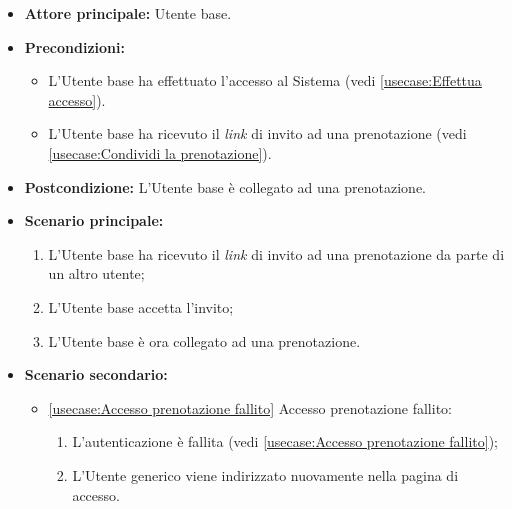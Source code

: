\label{usecase:Accesso alla prenotazione}
\begin{itemize}
	\item \textbf{Attore principale:} Utente base.

	\item \textbf{Precondizioni:} 
	\begin{itemize}
		\item L'Utente base ha effettuato l'accesso al Sistema (vedi \autoref{usecase:Effettua accesso}).
		\item L'Utente base ha ricevuto il \textit{link} di invito ad una prenotazione (vedi \autoref{usecase:Condividi la prenotazione}).
	\end{itemize}
		

	\item \textbf{Postcondizione:} L'Utente base è collegato ad una prenotazione.

	\item \textbf{Scenario principale:}
	      \begin{enumerate}
		      \item L'Utente base ha ricevuto il \textit{link} di invito ad una prenotazione da parte di un altro utente;
		      \item L'Utente base accetta l'invito;
		      \item L'Utente base è ora collegato ad una prenotazione.
	      \end{enumerate}

	\item \textbf{Scenario secondario:}
		  \begin{itemize}
			  \item \autoref{usecase:Accesso prenotazione fallito} Accesso prenotazione fallito:
			  \begin{enumerate}
				  \item L'autenticazione è fallita (vedi \autoref{usecase:Accesso prenotazione fallito});
				  \item L'Utente generico viene indirizzato nuovamente nella pagina di accesso.
			  \end{enumerate}	
		  \end{itemize}
\end{itemize}
